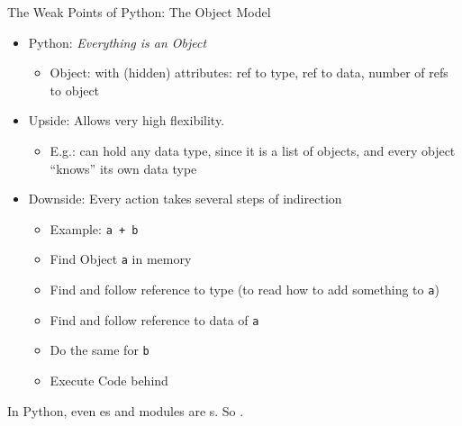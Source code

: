 \begin{frame}[fragile]{The Weak Points of Python: The Object Model}
%
\begin{itemize}
\item Python: \emph{Everything is an Object}
	\begin{itemize}
	\item Object:  with (hidden) attributes: ref to type, ref to data, number of refs to object
	\end{itemize}
\item Upside: Allows very high flexibility. 
	\begin{itemize}
	\item E.\;g.:  can hold any data type, since it is a list of objects, and every object \enquote{knows} its own data type
	\end{itemize}
\item Downside: Every action takes several steps of indirection
	\begin{itemize}
	\item Example: \texttt{a + b}
	\item Find Object \texttt{a} in memory
	\item Find and follow reference to type (to read how to add something to \texttt{a})
	\item Find and follow reference to data of \texttt{a}
	\item Do the same for \texttt{b}
	\item Execute Code behind 
	\end{itemize}
\end{itemize}
%
\begin{hintbox}
\scriptsize
In Python, even es and modules are s. So .
\end{hintbox}
%
\end{frame}


